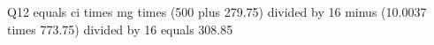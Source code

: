 Q12 equals ci times mg times (500 plus 279.75) divided by 16 minus (10.0037 times 773.75) divided by 16 equals 308.85